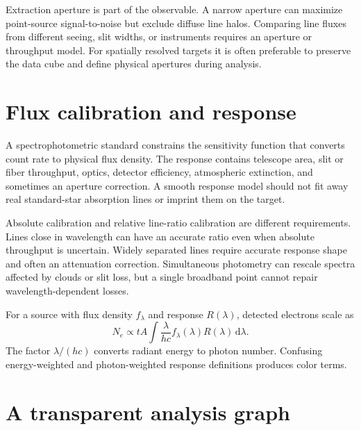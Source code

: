 Extraction aperture is part of the observable.  A narrow aperture can maximize
point-source signal-to-noise but exclude diffuse line halos.  Comparing line fluxes
from different seeing, slit widths, or instruments requires an aperture or throughput
model.  For spatially resolved targets it is often preferable to preserve the data
cube and define physical apertures during analysis.

\section{Flux calibration and response}

A spectrophotometric standard constrains the sensitivity function that converts count
rate to physical flux density.  The response contains telescope area, slit or fiber
throughput, optics, detector efficiency, atmospheric extinction, and sometimes an
aperture correction.  A smooth response model should not fit away real standard-star
absorption lines or imprint them on the target.

Absolute calibration and relative line-ratio calibration are different requirements.
Lines close in wavelength can have an accurate ratio even when absolute throughput is
uncertain.  Widely separated lines require accurate response shape and often an
attenuation correction.  Simultaneous photometry can rescale spectra affected by
clouds or slit loss, but a single broadband point cannot repair wavelength-dependent
losses.

For a source with flux density $f_\lambda$ and response $R(\lambda)$, detected
electrons scale as
\begin{equation}
 N_e\propto tA\int \frac{\lambda}{hc}
 f_\lambda(\lambda)R(\lambda)\,\mathrm{d}\lambda.
 \label{eq:photon-counting-response}
\end{equation}
The factor $\lambda/(hc)$ converts radiant energy to photon number.  Confusing
energy-weighted and photon-weighted response definitions produces color terms.

\section{A transparent analysis graph}

